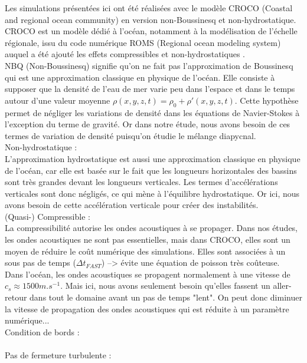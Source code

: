 \documentclass[a4paper,12pt]{article}
\begin{document}
    Les simulations présentées ici ont été réalisées avec le modèle CROCO (Coastal and regional ocean community) en version non-Boussinesq et non-hydrostatique.
    CROCO est un modèle dédié à l'océan, notamment à la modélisation de l'échelle régionale, issu du code numérique ROMS (Regional ocean modeling system) auquel a été ajouté les effets compressibles et non-hydrostatiques \citep{auclair_non-hydrostatic_2018}. \\
    \newline
    NBQ (Non-Boussinesq) signifie qu'on ne fait pas l'approximation de Boussinesq qui est une approximation classique en physique de l'océan. Elle consiste à supposer que la densité de l'eau de mer varie peu dans l'espace et dans le temps autour d'une valeur moyenne $\rho(x,y,z,t)=\rho_{0}+\rho'(x,y,z,t)$. Cette hypothèse permet de négliger les variations de densité dans les équations de Navier-Stokes à l'exception du terme de gravité. Or dans notre étude, nous avons besoin de ces termes de variation de densité puisqu'on étudie le mélange diapycnal. \\
    \newline
    Non-hydrostatique :\\
    L'approximation hydrostatique est aussi une approximation classique en physique de l'océan, car elle est basée sur le fait que les longueurs horizontales des bassins sont très grandes devant les longueurs verticales. Les termes d'accélérations verticales sont donc négligés, ce qui mène à l'équilibre hydrostatique. Or ici, nous avons besoin de cette accélération verticale pour créer des instabilités. \\
    \newline
    (Quasi-) Compressible :\\ 
    La compressibilité autorise les ondes acoustiques à se propager. Dans nos études, les ondes acoustiques ne sont pas essentielles, mais dans CROCO, elles sont un moyen de réduire le coût numérique des simulations. Elles sont associées à un sous pas de temps ($\Delta t_{FAST}$) --> évite une équation de poisson très coûteuse. \\
    Dans l'océan, les ondes acoustiques se propagent normalement à une vitesse de $c_s \approx 1500 m.s^{-1}$. Mais ici, nous avons seulement besoin qu'elles fassent un aller-retour dans tout le domaine avant un pas de temps "lent". On peut donc diminuer la vitesse de propagation des ondes acoustiques qui est réduite à un paramètre numérique... \\
    \newline
    Condition de bords :\\
     \\
    \newline
    Pas de fermeture turbulente :\\
\end{document}
